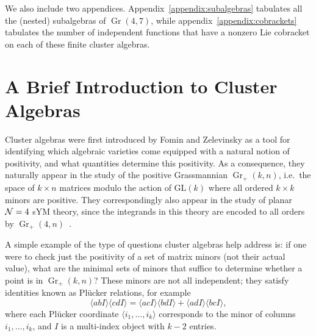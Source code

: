 \documentclass[12pt]{article}
\DeclareMathOperator{\Gr}{Gr}
\def\ket#1{\langle #1 \rangle}
\begin{document}
We also include two appendices. Appendix~\ref{appendix:subalgebras} tabulates all the (nested) subalgebras of $\Gr(4,7)$, while appendix~\ref{appendix:cobrackets} tabulates the number of independent functions that have a nonzero Lie cobracket on each of these finite cluster algebras.

\section{A Brief Introduction to Cluster Algebras} \label{sec:brief_intro}

Cluster algebras were first introduced by Fomin and Zelevinsky \cite{1021.16017} as a tool for identifying which algebraic varieties come equipped with a natural notion of positivity, and what quantities determine this positivity. As a consequence, they naturally appear in the study of the positive Grassmannian $\Gr_{+}(k,n)$, i.e.~the space of $k\times n$ matrices modulo the action of $\text{GL}(k)$ where all ordered $k\times k$ minors are positive. They correspondingly also appear in the study of planar ${\cal N} = 4$ sYM theory, since the integrands in this theory are encoded to all orders by $\Gr_+(4,n)$~\cite{ArkaniHamed:2012nw}.

A simple example of the type of questions cluster algebras help address is: if one were to check just the positivity of a set of matrix minors (not their actual value), what are the minimal sets of minors that suffice to determine whether a point is in $\Gr_+(k,n)$? These minors are not all independent; they satisfy identities known as Pl\"ucker relations, for example
\begin{equation}
  \label{eq:plucker-rel}
  \ket{abI} \ket{cdI} = \ket{acI} \ket{bdI} + \ket{adI}\ket{bcI},
\end{equation}
where each Pl\"ucker coordinate $\ket{i_1,\ldots,i_k}$ corresponds to the minor of columns $i_1, \ldots,i_k$, and $I$ is a multi-index object with $k-2$ entries.
\end{document}
